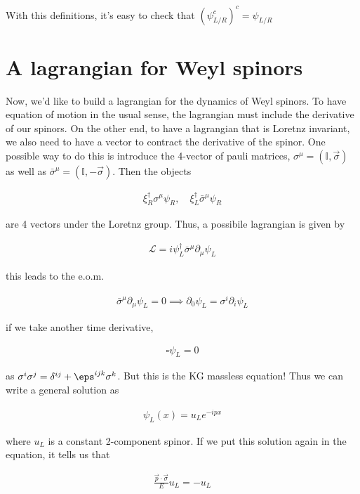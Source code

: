 \documentclass{report}
\begin{document}
With this definitions, it's easy to check that \((\psi_{L/R}^c)^c = \psi_{L/R}\)

\section{A lagrangian for Weyl spinors}

Now, we'd like to build a lagrangian for the dynamics of Weyl spinors. To have equation of motion in the usual sense, the lagrangian must include the derivative of our spinors. On the other end, to have a lagrangian that is Loretnz invariant, we also need to have a vector to contract the derivative of the spinor. One possible way to do this is introduce the 4-vector of pauli matrices, \(\sigma^\mu = (\mathbb{I}, \vec{\sigma})\) as well as \(\bar{\sigma}^\mu = (\mathbb{I}, -\vec{\sigma})\). Then the objects 

\begin{align}
    \xi^\dagger_{R}\sigma^\mu \psi_R, \quad \xi^\dagger_L \bar{\sigma}^\mu \psi_R
\end{align}

are 4 vectors under the Loretnz group. Thus, a possibile lagrangian is given by 

\begin{align}
    \mathcal{L} = i \psi_L^\dagger \bar{\sigma}^\mu\partial_\mu \psi_L
\end{align}

this leads to the e.o.m. 

\begin{align}
    \bar{\sigma}^\mu \partial_\mu \psi_L = 0 \implies \partial_0 \psi_L = \sigma^i\partial_i \psi_L
\end{align}

if we take another time derivative, 

\begin{align}
    \square\psi_L = 0 
\end{align}

as \(\sigma^i\sigma^j = \delta^{ij} + \eps^{ijk}\sigma^k\). But this is the KG massless equation! Thus we can write a general solution as 

\begin{align}
    \psi_L (x) = u_L e^{-ipx}
\end{align}

where \(u_L\) is a constant 2-component spinor. If we put this solution again in the equation, it tells us that 

\begin{align}
    \frac{\vec{p}\cdot \vec{\sigma}}{E}u_L = -u_L 
\end{align}
\end{document}
